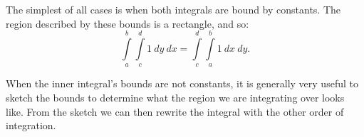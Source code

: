The simplest of all cases is when both integrals are bound by constants. The region described by these bounds is a rectangle, and so:
$$\int\limits_a^b\int\limits_c^d 1\ dy\ dx = \int\limits_c^d\int\limits_a^b1\ dx\ dy.$$

	\checkoddpage
{}
When the inner integral's bounds are not constants, it is generally very useful to sketch the bounds to determine what the region we are integrating over looks like. From the sketch we can then rewrite the integral with the other order of integration.

